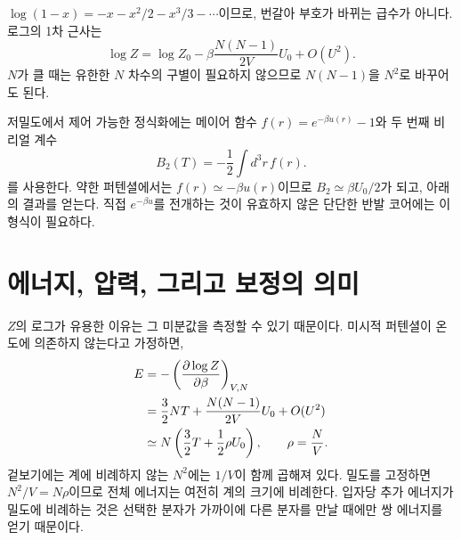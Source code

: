 \begin{classroomqa}
\end{classroomqa}

\(\log(1-x)=-x-x^2/2-x^3/3-\cdots\)이므로, 번갈아 부호가 바뀌는 급수가 아니다. 로그의 1차 근사는
\begin{equation}
 \log Z
 =
 \log Z_0
 -\beta\frac{N(N-1)}{2V}U_0
 +O(U^2).
 \label{eq:sm6-logz-correction}
\end{equation}
\(N\)가 클 때는 유한한 \(N\) 차수의 구별이 필요하지 않으므로 \(N(N-1)\)을 \(N^2\)로 바꾸어도 된다.

\begin{remark}저밀도에서 제어 가능한 정식화에는 메이어 함수
\(f(r)=e^{-\beta u(r)}-1\)와 두 번째 비리얼 계수
\begin{equation}
 B_2(T)=-\frac{1}{2}\int d^3r\,f(r).
 \label{eq:sm6-second-virial}
\end{equation}를 사용한다. 약한 퍼텐셜에서는 \(f(r)\simeq-\beta u(r)\)이므로 \(B_2\simeq\beta U_0/2\)가 되고, 아래의 결과를 얻는다. 직접 \(e^{-\beta u}\)를 전개하는 것이 유효하지 않은 단단한 반발 코어에는 이 형식이 필요하다.
\end{remark}

\section{에너지, 압력, 그리고 보정의 의미}

\(Z\)의 로그가 유용한 이유는 그 미분값을 측정할 수 있기 때문이다. 미시적 퍼텐셜이 온도에 의존하지 않는다고 가정하면,
\begin{align}
 E
 &=-\left(\frac{\partial\log Z}{\partial\beta}\right)_{V,N} \notag\\
 &=
 \frac{3}{2}NT
 +\frac{N(N-1)}{2V}U_0+O(U^2) \notag\\
 &\simeq
 N\left(\frac{3}{2}T+\frac{1}{2}\rho U_0\right),
 \qquad
 \rho=\frac{N}{V}.
 \label{eq:sm6-energy-correction}
\end{align}
겉보기에는 계에 비례하지 않는 \(N^2\)에는 \(1/V\)이 함께 곱해져 있다. 밀도를 고정하면 \(N^2/V=N\rho\)이므로 전체 에너지는 여전히 계의 크기에 비례한다. 입자당 추가 에너지가 밀도에 비례하는 것은 선택한 분자가 가까이에 다른 분자를 만날 때에만 쌍 에너지를 얻기 때문이다.

